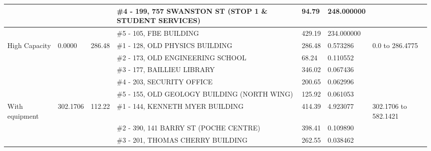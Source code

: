 \begin{table}[H]
{\begin{tabular}{|l|l|l|l|l|l|l|}
                         &                          &                                   & \#4 - 199, 757 SWANSTON ST (STOP 1 \& STUDENT SERVICES) & 94.79         & 248.000000      &                                    \\ \hline
                         &                          &                                   & \#5 - 105, FBE BUILDING                                     & 429.19        & 234.000000      &                                    \\ \hline
High Capacity            & 0.0000                   & 286.48                            & \#1 - 128, OLD PHYSICS BUILDING                             & 286.48        & 0.573286        & 0.0 to 286.4775                    \\ \hline
                         &                          &                                   & \#2 - 173, OLD ENGINEERING SCHOOL                           & 68.24         & 0.110552        &                                    \\ \hline
                         &                          &                                   & \#3 - 177, BAILLIEU LIBRARY                                 & 346.02        & 0.067436        &                                    \\ \hline
                         &                          &                                   & \#4 - 203, SECURITY OFFICE                                  & 200.65        & 0.062996        &                                    \\ \hline
                         &                          &                                   & \#5 - 155, OLD GEOLOGY BUILDING (NORTH WING)                & 125.92        & 0.061053        &                                    \\ \hline
With equipment          & 302.1706                 & 112.22                            & \#1 - 144, KENNETH MYER BUILDING                            & 414.39        & 4.923077        & 302.1706 to 582.1421               \\ \hline
                         &                          &                                   & \#2 - 390, 141 BARRY ST (POCHE CENTRE)                      & 398.41        & 0.109890        &                                    \\ \hline
                         &                          &                                   & \#3 - 201, THOMAS CHERRY BUILDING                           & 262.55        & 0.038462        &                                    \\ \hline

\end{tabular}}
\end{table}
